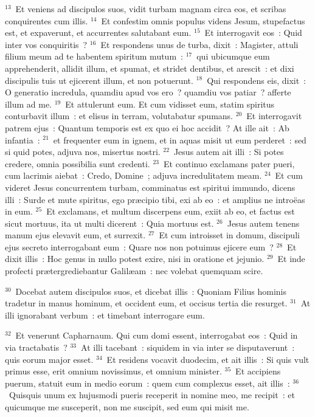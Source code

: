 ${}^{13}$~Et veniens ad discipulos suos, vidit turbam magnam circa eos, et scribas conquirentes cum illis.
${}^{14}$~Et confestim omnis populus videns Jesum, stupefactus est, et expaverunt, et accurrentes salutabant eum.
${}^{15}$~Et interrogavit eos~: Quid inter vos conquiritis~?
${}^{16}$~Et respondens unus de turba, dixit~: Magister, attuli filium meum ad te habentem spiritum mutum~:
${}^{17}$~qui ubicumque eum apprehenderit, allidit illum, et spumat, et stridet dentibus, et arescit~: et dixi discipulis tuis ut ejicerent illum, et non potuerunt.
${}^{18}$~Qui respondens eis, dixit~: O generatio incredula, quamdiu apud vos ero~? quamdiu vos patiar~? afferte illum ad me.
${}^{19}$~Et attulerunt eum. Et cum vidisset eum, statim spiritus conturbavit illum~: et elisus in terram, volutabatur spumans.
${}^{20}$~Et interrogavit patrem ejus~: Quantum temporis est ex quo ei hoc accidit~? At ille ait~: Ab infantia~:
${}^{21}$~et frequenter eum in ignem, et in aquas misit ut eum perderet~: sed si quid potes, adjuva nos, misertus nostri.
${}^{22}$~Jesus autem ait illi~: Si potes credere, omnia possibilia sunt credenti.
${}^{23}$~Et continuo exclamans pater pueri, cum lacrimis aiebat~: Credo, Domine~; adjuva incredulitatem meam.
${}^{24}$~Et cum videret Jesus concurrentem turbam, comminatus est spiritui immundo, dicens illi~: Surde et mute spiritus, ego pr\ae cipio tibi, exi ab eo~: et amplius ne intro\"eas in eum.
${}^{25}$~Et exclamans, et multum discerpens eum, exiit ab eo, et factus est sicut mortuus, ita ut multi dicerent~: Quia mortuus est.
${}^{26}$~Jesus autem tenens manum ejus elevavit eum, et surrexit.
${}^{27}$~Et cum introisset in domum, discipuli ejus secreto interrogabant eum~: Quare nos non potuimus ejicere eum~?
${}^{28}$~Et dixit illis~: Hoc genus in nullo potest exire, nisi in oratione et jejunio.
${}^{29}$~Et inde profecti pr\ae tergrediebantur Galil\ae am~: nec volebat quemquam scire.


${}^{30}$~Docebat autem discipulos suos, et dicebat illis~: Quoniam Filius hominis tradetur in manus hominum, et occident eum, et occisus tertia die resurget.
${}^{31}$~At illi ignorabant verbum~: et timebant interrogare eum.


${}^{32}$~Et venerunt Capharnaum. Qui cum domi essent, interrogabat eos~: Quid in via tractabatis~?
${}^{33}$~At illi tacebant~: siquidem in via inter se disputaverunt~: quis eorum major esset.
${}^{34}$~Et residens vocavit duodecim, et ait illis~: Si quis vult primus esse, erit omnium novissimus, et omnium minister.
${}^{35}$~Et accipiens puerum, statuit eum in medio eorum~: quem cum complexus esset, ait illis~:
${}^{36}$~Quisquis unum ex hujusmodi pueris receperit in nomine meo, me recipit~: et quicumque me susceperit, non me suscipit, sed eum qui misit me.


